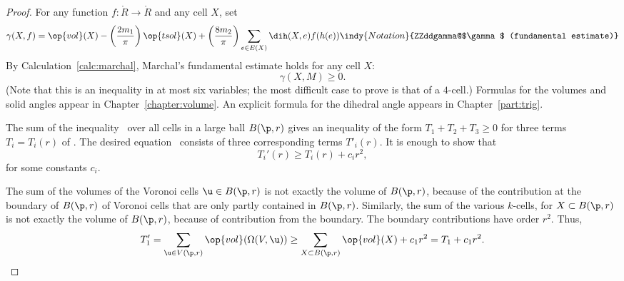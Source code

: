 \begin{proof}
For any function $f:\ring{R}\to\ring{R}$ and any cell $X$, set
\begin{equation}\label{eqn:gamma-def}
\gamma(X,f) =  \op{vol}(X)
-\left(\frac{2m_1}{\pi}\right) \op{tsol}(X) + \left(\frac{8m_2}{\pi}\right)
\sum_{e\in E(X)} \dih(X,e)  f(h(e))
\indy{Notation}{ZZddgamma@$\gamma$ (fundamental estimate)}%
\end{equation}
By Calculation~\ref{calc:marchal}, Marchal's fundamental estimate
holds for any cell
$X$: %
\begin{equation}\label{eqn:mfe}
\gamma(X,M)\ge 0.
\end{equation}
(Note that this is an inequality in at most six variables; the most
difficult case to prove is that of a $4$-cell.)  Formulas for the
volumes and solid angles appear in Chapter~\ref{chapter:volume}.  An
explicit formula for the dihedral angle appears in
Chapter~\ref{part:trig}.

The sum of the inequality~ over all cells in a large ball
$B(\p,r)$ gives an inequality of the form $T_1 + T_2 + T_3\ge 0$ for
three terms $T_i = T_i(r)$ of .  The desired
equation~ consists of three corresponding terms
$T'_i(r)$.  It is enough to show that
\begin{displaymath}
T_i'(r) \ge T_i(r) + c_i r^2,
\end{displaymath}
for some constants $c_i$.

The sum of the volumes of the Voronoi cells $ \u\in B(\p,r)$ is not
exactly the volume of $B(\p,r)$, because of the contribution at the
boundary of $B(\p,r)$ of Voronoi cells that are only partly contained
in $B(\p,r)$.  Similarly, the sum of the various $k$-cells, for
$X\subset B(\p,r)$ is not exactly the volume of $B(\p,r)$, because of
contribution from the boundary. The boundary contributions have order
$r^2$. Thus,
\begin{displaymath}
T_1'= \sum_{ \u\in  V(\p,r)} \op{vol}(\Omega(V, \u)) \ge \sum_{X\subset B(\p,r)} \op{vol}(X) + c_1 r^2 = T_1 + c_1 r^2.
\end{displaymath}



\end{proof}
